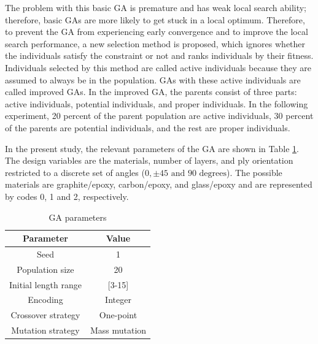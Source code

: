 \documentclass[USenglish,twocolumn]{article}
\begin{document}
The problem with this basic GA is premature and has weak local search ability; therefore, basic GAs are more likely
to get stuck in a local optimum. Therefore, to prevent the GA from experiencing early convergence and to improve the
local search performance, a new selection method is proposed, which ignores whether the
individuals satisfy the constraint or not and ranks individuals by their fitness. Individuals
selected by this method are called active individuals because they are assumed to always be in the
population. GAs with these active individuals are called improved GAs. In the improved GA, the parents
consist of three parts: active individuals, potential individuals, and proper individuals. In the
following experiment, 20 percent of the parent population are active individuals, 30 percent of the
parents are potential individuals, and the rest are proper individuals.

In the present study, the relevant parameters of the GA are shown in Table \ref{tab:ga}. The design
variables are the materials, number of layers, and ply orientation restricted to a discrete set of
angles ($0,\pm 45 \text{ and } 90 \text{ degrees} $). The possible materials are graphite/epoxy,
carbon/epoxy, and glass/epoxy and are represented by codes 0, 1 and 2, respectively.


\begin{table}[h]
\centering
\caption{GA parameters}
\begin{adjustbox}{width=0.45\textwidth}
\label{tab:ga}
\begin{tabular}{cc}
\toprule
Parameter				&  Value  \\
\midrule
Seed					& 1       \\
Population size			& 20      \\
Initial length range	& [3-15]  \\
Encoding				& Integer  \\
Crossover strategy		& One-point \\
Mutation strategy		& Mass mutation \\
\bottomrule
\end{tabular}
\end{adjustbox}
\end{table}
\end{document}
